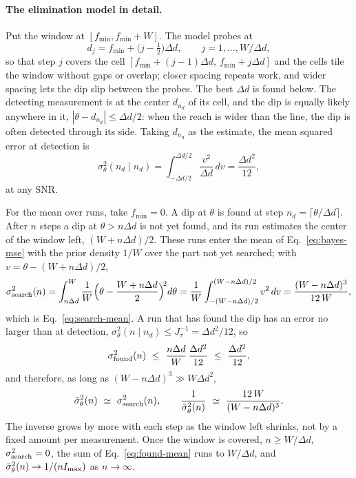 \paragraph{The elimination model in detail.} Put the window at $[f_{\min},f_{\min}+W]$. The model probes at
\begin{equation*}
  d_j=f_{\min}+\big(j-\tfrac12\big)\Delta d,\qquad j=1,\dots,W/\Delta d,
\end{equation*}
so that step $j$ covers the cell $[f_{\min}+(j-1)\Delta d,\,f_{\min}+j\Delta d]$ and the cells tile the window
without gaps or overlap; closer spacing repeats work, and wider spacing lets the dip slip between the probes. The
best $\Delta d$ is found below. The detecting measurement is at the center $d_{n_d}$ of its cell, and the dip is
equally likely anywhere in it, $|\theta-d_{n_d}|\le\Delta d/2$: when the reach is wider than the line, the dip is
often detected through its side. Taking $d_{n_d}$ as the estimate, the mean squared error at detection is
\begin{equation*}
  \sigma_\theta^2(n_d\mid n_d)=\int_{-\Delta d/2}^{\Delta d/2}\frac{v^2}{\Delta d}\,dv=\frac{\Delta d^2}{12},
\end{equation*}
at any SNR.

For the mean over runs, take $f_{\min}=0$. A dip at $\theta$ is found at step $n_d=\lceil\theta/\Delta d\rceil$.
After $n$ steps a dip at $\theta>n\Delta d$ is not yet found, and its run estimates the center of the window left,
$(W+n\Delta d)/2$. These runs enter the mean of Eq.~\eqref{eq:bayes-mse} with the prior density $1/W$ over the part
not yet searched; with $v=\theta-(W+n\Delta d)/2$,
\begin{equation*}
  \sigma_{\rm search}^2(n)=\int_{n\Delta d}^{W}\frac1W\Big(\theta-\frac{W+n\Delta d}{2}\Big)^{\!2}d\theta
  =\frac1W\int_{-(W-n\Delta d)/2}^{(W-n\Delta d)/2}v^2\,dv=\frac{(W-n\Delta d)^3}{12\,W},
\end{equation*}
which is Eq.~\eqref{eq:search-mean}. A run that has found the dip has an error no larger than at detection,
$\sigma_\theta^2(n\mid n_d)\le J_\tau^{-1}=\Delta d^2/12$, so
\begin{equation*}
  \sigma_{\rm found}^2(n)\ \le\ \frac{n\Delta d}{W}\,\frac{\Delta d^2}{12}\ \le\ \frac{\Delta d^2}{12},
\end{equation*}
and therefore, as long as $(W-n\Delta d)^3\gg W\Delta d^2$,
\begin{equation*}
  \bar\sigma_\theta^2(n)\ \simeq\ \sigma_{\rm search}^2(n),\qquad
  \frac{1}{\bar\sigma_\theta^2(n)}\ \simeq\ \frac{12\,W}{(W-n\Delta d)^3}.
\end{equation*}
The inverse grows by more with each step as the window left shrinks, not by a fixed amount per measurement. Once the
window is covered, $n\ge W/\Delta d$, $\sigma_{\rm search}^2=0$, the sum of Eq.~\eqref{eq:found-mean} runs to
$W/\Delta d$, and $\bar\sigma_\theta^2(n)\to1/(nI_{\rm max})$ as $n\to\infty$.

